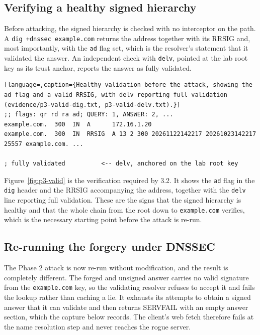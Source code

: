 \documentclass[11pt]{article}
\begin{document}
\subsection{Verifying a healthy signed hierarchy}

Before attacking, the signed hierarchy is checked with no interceptor on the path.
A \texttt{dig +dnssec example.com} returns the address together with its RRSIG and,
most importantly, with the \texttt{ad} flag set, which is the resolver's statement
that it validated the answer. An independent check with \texttt{delv}, pointed at
the lab root key as its trust anchor, reports the answer as fully validated.

\begin{lstlisting}[language=,caption={Healthy validation before the attack, showing the ad flag and a valid RRSIG, with delv reporting full validation (evidence/p3-valid-dig.txt, p3-valid-delv.txt).}]
;; flags: qr rd ra ad; QUERY: 1, ANSWER: 2, ...
example.com.  300  IN  A      172.16.1.20
example.com.  300  IN  RRSIG  A 13 2 300 20261122142217 20261023142217 25557 example.com. ...

; fully validated          <-- delv, anchored on the lab root key
\end{lstlisting}


Figure~\ref{fig:p3-valid} is the verification required by 3.2.
It shows the \texttt{ad} flag in the \texttt{dig} header and the RRSIG
accompanying the address, together with the \texttt{delv} line reporting full
validation. These are the signs that the signed hierarchy is healthy and that the
whole chain from the root down to \texttt{example.com} verifies, which is the
necessary starting point before the attack is re-run.

\subsection{Re-running the forgery under DNSSEC}

The Phase 2 attack is now re-run without modification, and the result is completely
different. The forged and unsigned answer carries no valid signature from the
\texttt{example.com} key, so the validating resolver refuses to accept it and fails
the lookup rather than caching a lie. It exhausts its attempts to obtain a signed
answer that it can validate and then returns SERVFAIL with an empty answer section,
which the capture below records. The client's web fetch therefore fails at the name
resolution step and never reaches the rogue server.
\end{document}

